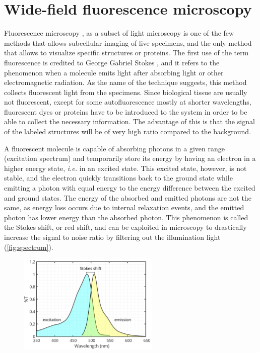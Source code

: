 \section{Wide-field fluorescence microscopy}

Fluorescence microscopy \cite{lichtman_fluorescence_2005,diaspro_optical_2011}, as a subset of light microscopy is one of the few methods that allows subcellular imaging of live specimens, and the only method that allows to visualize specific structures or proteins. The first use of the term fluorescence is credited to  George Gabriel Stokes \cite{stokes_change_1852}, and it refers to the phenomenon when a molecule emits light after absorbing light or other electromagnetic radiation. As the name of the technique suggests, this method collects fluorescent light from the specimens.
Since biological tissue are usually not fluorescent, except for some autofluorescence mostly at shorter wavelengths, fluorescent dyes or proteins have to be introduced to the system in order to be able to collect the necessary information. The advantage of this is that the signal of the labeled structures will be of very high ratio compared to the background.

A fluorescent molecule is capable of absorbing photons in a given range (excitation spectrum) and temporarily store its energy by having an electron in  a higher energy state, \textit{i.e.} in an excited state. This excited state, however, is not stable, and the electron quickly transitions back to the ground state while emitting a photon with equal energy to the energy difference between the excited and ground states. The energy of the absorbed and emitted photons are not the same, as energy loss occurs due to internal relaxation events, and the emitted photon has lower energy than the absorbed photon. This phenomenon is called the Stokes shift, or red shift, and can be exploited in microscopy to drastically increase the signal to noise ratio by filtering out the illumination light (\autoref{fig:spectrum}).

  \begin{figure}
    \centering
    \includegraphics[width=0.6\textwidth]{spectrum/egfp}
    \label{fig:spectrum}
  \end{figure}

